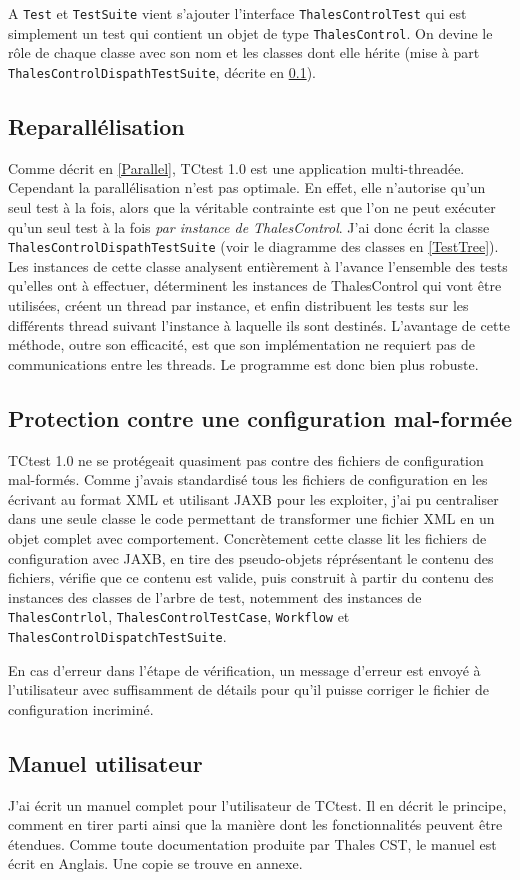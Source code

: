 A \verb|Test| et \verb|TestSuite| vient s'ajouter l'interface 
\verb|ThalesControlTest| qui est simplement un test qui contient un objet de 
type \verb|ThalesControl|. On devine le rôle de chaque classe avec son nom et 
les classes dont elle hérite (mise à part \verb|ThalesControlDispathTestSuite|, 
décrite en \ref{ReParallel}).

\subsection{Reparallélisation}
\label{ReParallel}

Comme décrit en \ref{Parallel}, TCtest 1.0 est une application multi-threadée.
Cependant la parallélisation n'est pas optimale. En effet, elle n'autorise 
qu'un seul test à la fois, alors que la véritable contrainte est que l'on ne 
peut exécuter qu'un seul test à la fois \textit{par instance de ThalesControl}. 
J'ai donc écrit la classe \verb|ThalesControlDispathTestSuite| (voir le 
diagramme des classes en \ref{TestTree}). Les instances de cette classe 
analysent entièrement à l'avance l'ensemble 
des tests qu'elles ont à effectuer, déterminent les instances de ThalesControl qui 
vont être utilisées, créent un thread par instance, et enfin distribuent
les tests sur les différents thread suivant l'instance à laquelle ils sont 
destinés. L'avantage de cette méthode, outre son efficacité, est que son 
implémentation ne requiert pas de communications entre les threads. Le programme 
est donc bien plus robuste.

\subsection{Protection contre une configuration mal-formée}

TCtest 1.0 ne se protégeait quasiment pas contre des fichiers de configuration 
mal-formés. Comme j'avais standardisé tous les fichiers de configuration en 
les écrivant au format XML et utilisant JAXB pour les exploiter, j'ai pu 
centraliser dans une seule classe le code permettant de transformer une fichier 
XML en un objet complet avec comportement. Concrètement cette classe lit 
les fichiers de configuration avec JAXB, en tire des pseudo-objets réprésentant 
le contenu des fichiers, vérifie que ce contenu est valide, puis construit à 
partir du contenu des instances des classes de l'arbre de test, notemment des 
instances de \verb|ThalesContrlol|, \verb|ThalesControlTestCase|, 
\verb|Workflow| et \verb|ThalesControlDispatchTestSuite|.

En cas d'erreur dans l'étape de vérification, un message d'erreur est envoyé à 
l'utilisateur avec suffisamment de détails pour qu'il puisse corriger le fichier
de configuration incriminé.

\subsection{Manuel utilisateur}

J'ai écrit un manuel complet pour l'utilisateur de TCtest. Il en décrit le 
principe, comment en tirer parti ainsi que la manière dont les fonctionnalités
peuvent être étendues. Comme toute documentation produite par Thales CST, le 
manuel est écrit en Anglais. Une copie se trouve en annexe.